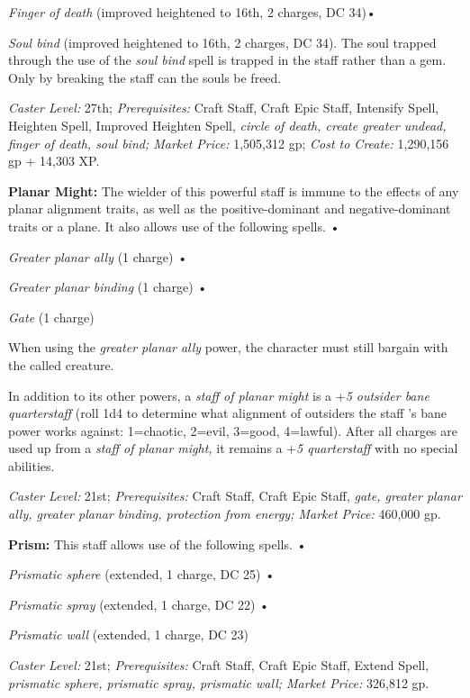 \documentclass{article}
\begin{document}
\textit{Finger of death }(improved heightened to 16th, 2 charges, DC 34)• 

\textit{Soul bind }(improved heightened to 16th, 2 charges, DC 34). The soul trapped 
through the use of the \textit{soul bind }spell is trapped in the staff rather 
than a gem. Only by breaking the staff can the souls be freed. 

\parindent=0pt
\textit{Caster Level: }27th; \textit{Prerequisites: }Craft Staff, Craft Epic Staff, 
Intensify Spell, Heighten Spell, Improved Heighten Spell, \textit{circle of death, 
create greater undead, finger of death, soul bind; Market Price: }1,505,312 gp; 
\textit{Cost to Create: }1,290,156 gp + 14,303 XP. 

\textbf{Planar Might: }The wielder of this powerful staff is immune to the effects 
of any planar alignment traits, as well as the positive-dominant and negative-dominant 
traits or a plane. It also allows use of the following spells. • 

\textit{Greater planar ally }(1 charge) • 

\textit{Greater planar binding }(1 charge) • 

\textit{Gate }(1 charge) 

When using the \textit{greater planar ally }power, the character must still bargain 
with the called creature. 

In addition to its other powers, a \textit{staff of planar might }is a +\textit{5 
outsider bane quarterstaff }(roll 1d4 to determine what alignment of outsiders 
the staff 's bane power works against: 1=chaotic, 2=evil, 3=good, 4=lawful). After 
all charges are used up from a \textit{staff of planar might, }it remains a +\textit{5 
quarterstaff }with no special abilities. 

\textit{Caster Level: }21st; \textit{Prerequisites: }Craft Staff, Craft Epic Staff, 
\textit{gate, greater planar ally, greater planar binding, protection from energy; 
Market Price: }460,000 gp. 

\textbf{Prism: }This staff allows use of the following spells. • 

\parindent=3pt
\textit{Prismatic sphere }(extended, 1 charge, DC 25) • 

\textit{Prismatic spray }(extended, 1 charge, DC 22) • 

\textit{Prismatic wall }(extended, 1 charge, DC 23) 

\parindent=0pt
\textit{Caster Level: }21st; \textit{Prerequisites: }Craft Staff, Craft Epic Staff, 
Extend Spell, \textit{prismatic sphere, prismatic spray, prismatic wall; Market 
Price: }326,812 gp. 
\end{document}
